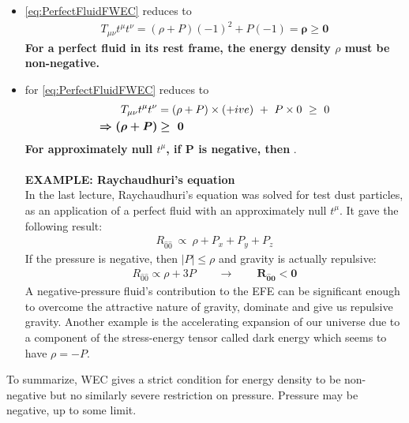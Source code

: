 \documentclass[10pt]{article}
\begin{document}
            	\begin{itemize}
                    \item {} \eqref{eq:PerfectFluidFWEC} reduces to
                        \begin{align}
                	        T_{\mu\nu}t^{\mu}t^{\nu} = (\rho+P)(-1)^2 + P(-1) = \boldsymbol{\rho \geq 0}
                	    \end{align}
                    \textbf{For a perfect fluid in its rest frame, the energy density $\rho$ must be non-negative.}
                    \item {} for  \eqref{eq:PerfectFluidFWEC} reduces to
                        \begin{align}
                	        T_{\mu\nu}t^{\mu}t^{\nu} &= (\rho+P) \times (+ive)\ +\  P \times 0 \ \geq \ 0 \notag \\
                	        \boldsymbol{\Rightarrow(\rho+P)} &\boldsymbol{\geq \ 0}
                        \end{align}
                   	\textbf{For approximately null $t^{\mu}$, if P is negative, then} .\\  
                   	\\
        	        \textbf{EXAMPLE: Raychaudhuri's equation} \\
        	        In the last lecture, Raychaudhuri's equation was solved for test dust particles, as an application of a perfect fluid with an approximately null $t^{\mu}$. It gave the following result:
        	            \begin{align}
                            R_{\hat{0}\hat{0}}\  \propto \ \rho + P_{x} + P_{y} + P_{z} 
                        \end{align}
                    If the pressure is negative, then $|P| \leq \rho$ and gravity is actually repulsive:
                        \begin{align}
                            R_{\hat{0}\hat{0}} \propto \rho + 3P \qquad \to \qquad \boldsymbol{R_{\hat{0}\hat{0}} < 0 }
                        \end{align}
            	    A negative-pressure fluid's contribution to the EFE can be significant enough to overcome the attractive nature of gravity, dominate and give us repulsive gravity. Another example is the accelerating expansion of our universe due to a component of the stress-energy tensor called dark energy which seems to have $\rho = -P$.
                \end{itemize}
            	To summarize, WEC gives a strict condition for energy density to be non-negative but no similarly severe restriction on pressure. Pressure may be negative, up to some limit. 
            	               	
\end{document}
